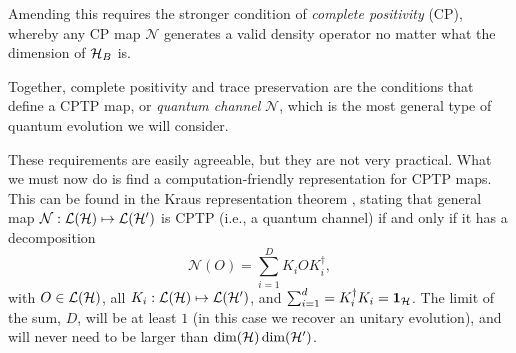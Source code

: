 		Amending this requires the stronger condition of \emph{complete positivity} (CP), whereby any CP map $\mathcal{N}$ generates a valid density operator no matter what the dimension of $\mathcal{H}_B$ is.
		
		Together, complete positivity and trace preservation are the conditions that define a CPTP map, or \emph{quantum channel} $\mathcal{N}$, which is the most general type of quantum evolution we will consider.
		
		These requirements are easily agreeable, but they are not very practical. What we must now do is find a computation-friendly representation for CPTP maps. This can be found in the Kraus representation theorem \cite{wilde_2013_book}, stating that general map $\mathcal{N} : \mathcal{L}(\mathcal{H}) \mapsto \mathcal{L}(\mathcal{H}^\prime)$ is CPTP (i.e., a quantum channel) if and only if it has a decomposition
		$$
			\mathcal{N}(O) = \sum_{i=1}^D K_i O K_i^\dagger ,
		$$
		with $O \in \mathcal{L}(\mathcal{H})$, all $K_i : \mathcal{L}(\mathcal{H}) \mapsto \mathcal{L}(\mathcal{H}^\prime)$, and $\sum_{i=1}^d = K_i^\dagger K_i = \mathbf{1}_{\mathcal{H}}$. The limit of the sum, $D$, will be at least $1$ (in this case we recover an unitary evolution), and will never need to be larger than $\text{dim}(\mathcal{H}) \,\text{dim}(\mathcal{H}^\prime)$.
		
